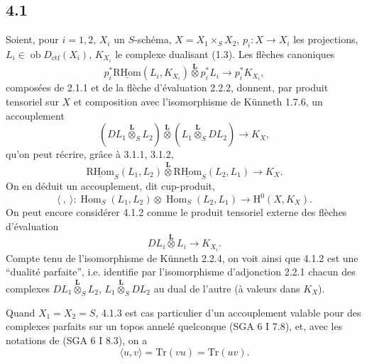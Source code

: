 \documentclass[11pt]{article}
\renewcommand{\H}{\mathrm{H}}
\DeclareMathOperator{\Hom}{Hom}
\newcommand{\R}{\mathrm{R}}\newcommand{\RHomCore}{\mathrm{RHom}}
\newcommand{\ob}{\operatorname{ob}}
\providecommand{\RHom}{\RHomCore}
\providecommand{\uRHom}{\underline{\RHom}}
\providecommand{\Dctf}{D_{\mathrm{ctf}}}
\providecommand{\Dctf}{D_{\mathrm{ctf}}}
\providecommand{\RHom}{\RHomCore}
\providecommand{\Hom}{\operatorname{Hom}}
\providecommand{\ob}{\operatorname{ob}}
\providecommand{\RHom}{\R\mathcal{H}om}
\providecommand{\R}{\mathrm R}
\providecommand{\RHom}{\RHomCore}
\providecommand{\Hom}{\operatorname{Hom}}
\begin{document}
\subsection*{4.1}
Soient, pour $i=1,2$, $X_i$ un $S$-schéma, $X=X_1\times_SX_2$, $p_i:X\to X_i$ les projections, $L_i\in\ob\Dctf(X_i)$, $K_{X_i}$ le complexe dualisant (1.3). Les flèches canoniques
\begin{equation}
p_i^*\uRHom(L_i,K_{X_i})\overset{\mathbf L}{\otimes}p_i^*L_i
\longrightarrow p_i^*K_{X_i},
\tag{4.1.1}
\end{equation}
composées de 2.1.1 et de la flèche d'évaluation 2.2.2, donnent, par produit tensoriel sur $X$ et composition avec l'isomorphisme de Künneth 1.7.6, un accouplement
\begin{equation}
(DL_1\overset{\mathbf L}{\otimes}_S L_2)\overset{\mathbf L}{\otimes}(L_1\overset{\mathbf L}{\otimes}_S DL_2)
\longrightarrow K_X,
\tag{4.1.2}
\end{equation}
qu'on peut récrire, grâce à 3.1.1, 3.1.2,
\begin{equation}
\uRHom_S(L_1,L_2)\overset{\mathbf L}{\otimes}\uRHom_S(L_2,L_1)
\longrightarrow K_X.
\tag{4.1.3}
\end{equation}
On en déduit un accouplement, dit cup-produit,
\begin{equation}
\langle\ ,\ \rangle:\Hom_S(L_1,L_2)\otimes\Hom_S(L_2,L_1)
\longrightarrow \H^0(X,K_X).
\tag{4.1.4}
\end{equation}
On peut encore considérer 4.1.2 comme le produit tensoriel externe des flèches d'évaluation
\[
DL_i\overset{\mathbf L}{\otimes}L_i\longrightarrow K_{X_i}.
\]
Compte tenu de l'isomorphisme de Künneth 2.2.4, on voit ainsi que 4.1.2 est une ``dualité parfaite'', i.e. identifie par l'isomorphisme d'adjonction 2.2.1 chacun des complexes $DL_1\overset{\mathbf L}{\otimes}_S L_2$, $L_1\overset{\mathbf L}{\otimes}_S DL_2$ au dual de l'autre (à valeurs dans $K_X$).

Quand $X_1=X_2=S$, 4.1.3 est cas particulier d'un accouplement valable pour des complexes parfaits sur un topos annelé quelconque (SGA 6 I 7.8), et, avec les notations de (SGA 6 I 8.3), on a
\begin{equation}
\langle u,v\rangle=\mathrm{Tr}(vu)=\mathrm{Tr}(uv).
\tag{4.1.5}
\end{equation}
\end{document}
